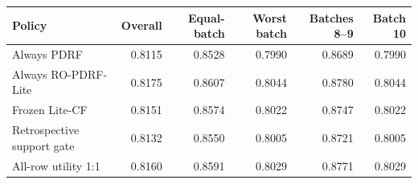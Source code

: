 \begin{tabular}{lrrrrr}
\toprule
Policy & Overall & Equal-batch & Worst batch & Batches 8--9 & Batch 10 \\
\midrule
Always PDRF & 0.8115 & 0.8528 & 0.7990 & 0.8689 & 0.7990 \\
Always RO-PDRF-Lite & 0.8175 & 0.8607 & 0.8044 & 0.8780 & 0.8044 \\
Frozen Lite-CF & 0.8151 & 0.8574 & 0.8022 & 0.8747 & 0.8022 \\
Retrospective support gate & 0.8132 & 0.8550 & 0.8005 & 0.8721 & 0.8005 \\
All-row utility 1:1 & 0.8160 & 0.8591 & 0.8029 & 0.8771 & 0.8029 \\
\bottomrule
\end{tabular}

